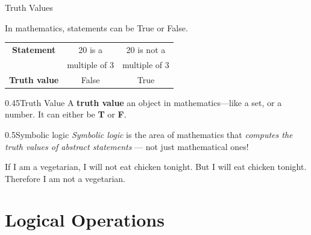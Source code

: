 \documentclass[12pt,aspectratio=1610, handout]{beamer}
\begin{document}
\begin{frame}{Truth Values} \p
	\begin{block}{In mathematics, statements can be True or False.}
		\begin{center}{\small
			\begin{tabular}{|c|c|c|}
				\hline
				\textbf{Statement} & 20 is a & 20 is not a \\
				& multiple of 3 & multiple of 3 \\
				\hline
				\textbf{Truth value} & False & True \\
				\hline
			\end{tabular}}
		\end{center}
	\end{block}\p
	
	\begin{blockz}{0.45}{Truth Value} 
	A \textbf{truth value} an object in mathematics---like a set, or a number. It can either be \textbf{T} or \textbf{F}. 
	\end{blockz}
	\p
	\begin{blockz}{0.5}{Symbolic logic}
		\emph{Symbolic logic} is the area of mathematics that \emph{computes the truth values of abstract statements} --- not just mathematical ones!
	\end{blockz}\p
	
	\begin{example}
		If I am a vegetarian, I will not eat chicken tonight. \p But I will eat chicken tonight. Therefore I am not a vegetarian.  
	\end{example}
	
	
	
\end{frame}

\section{Logical Operations}
\end{document}
